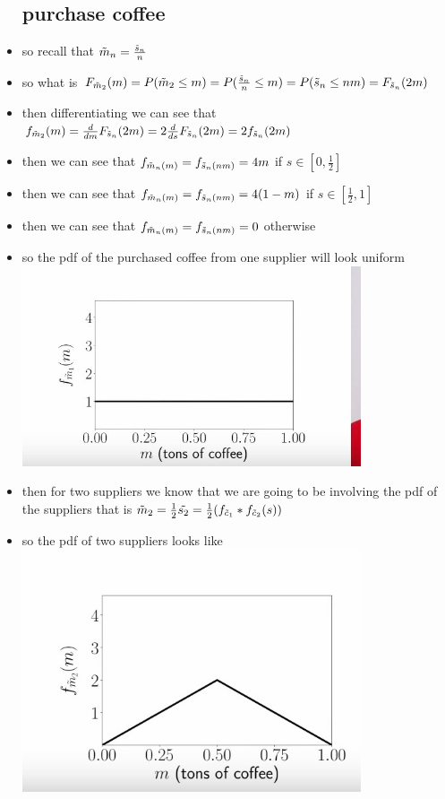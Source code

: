 \documentclass{article}
\begin{document}
\begin{itemize}
\subsection{purchase coffee}
\item so recall that $\Tilde{m}_{n}=\frac{\Tilde{s}_{n}}{n}$
\item so what is $F_{\Tilde{m}_{2}}(m)=P(\Tilde{m}_{2}\leq m)=P(\frac{\Tilde{s}_{n}}{n}\leq m)=P(\Tilde{s}_{n}\leq nm)=F_{\Tilde{s}_{n}}(2m)$
\item then differentiating we can see that $f_{\Tilde{m}_{2}}(m)=\frac{d}{dm}F_{\Tilde{s}_n}(2m)=2\frac{d}{ds}F_{\Tilde{s}_n}(2m)=2f_{\Tilde{s}_{n}}(2m)$
\item then we can see that $f_{\Tilde{m}_{n}(m)}=f_{\Tilde{s}_{n}(nm)}=4m$ if $s\in [0,\frac{1}{2}]$
\item then we can see that $f_{\Tilde{m}_{n}(m)}=f_{\Tilde{s}_{n}(nm)}=4(1-m)$ if $s\in [\frac{1}{2},1]$
\item then we can see that $f_{\Tilde{m}_{n}(m)}=f_{\Tilde{s}_{n}(nm)}=0$ otherwise
\item so the pdf of the purchased coffee from one supplier will look uniform \\ \includegraphics[width=10cm]{notes/week_4/vidio 1: Why Sums And Averages Tend To Look Gaussian/immages/v1_6.jpg}
\item then for two suppliers we know that we are going to be involving the pdf of the suppliers that is $\Tilde{m}_{2}=\frac{1}{2}\Tilde{s_2}=\frac{1}{2}(f_{\Tilde{c}_{1}}*f_{\Tilde{c}_2}(s))$
\item so the pdf of two suppliers looks like \includegraphics[width=10cm]{notes/week_4/vidio 1: Why Sums And Averages Tend To Look Gaussian/immages/v1_7.jpg}

\end{itemize}
\end{document}
